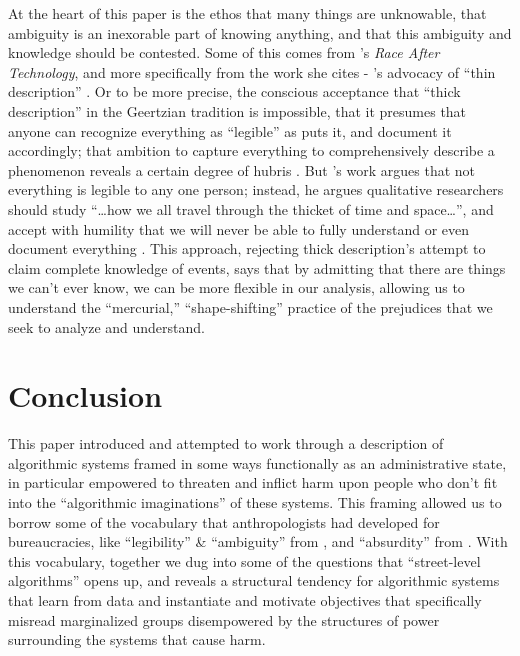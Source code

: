 \documentclass[manuscript,screen]{acmart}
\begin{document}
At the heart of this paper is the ethos that many things are unknowable, that ambiguity is an inexorable part of knowing anything, and that this ambiguity and knowledge should be contested.
Some of this comes from \citeauthor{benjamin2019race}'s \emph{Race After Technology}, and more specifically from the work she cites - \citeauthor{jackson2013thin}'s advocacy of ``thin description''
\cite{benjamin2019race,jackson2013thin}.
Or to be more precise, the conscious acceptance that ``thick description'' in the Geertzian tradition is impossible, that it presumes that anyone can recognize everything as ``legible'' as \citeauthor{scott1998seeing} puts it, and document it accordingly;
that ambition to capture everything to comprehensively describe a phenomenon reveals a certain degree of hubris
\cite{benjamin2019race}.
But \citeauthor{jackson2013thin}'s work argues that not everything is legible to any one person;
instead, he argues qualitative researchers should study ``\dots how we all travel through the thicket of time and space\dots '', and accept with humility that we will never be able to fully understand or even document everything
\cite{jackson2013thin}.
This approach, rejecting thick description's attempt to claim complete knowledge of events, says that by admitting that there are things we can't ever know, we can be more flexible in our analysis, allowing us to understand the ``mercurial,'' ``shape-shifting'' practice of the prejudices that we seek to analyze and understand.


\section{Conclusion}

This paper introduced and attempted to work through a description of algorithmic systems framed in some ways functionally as an administrative state, in particular empowered to threaten and inflict harm upon people who don't fit into the ``algorithmic imaginations'' of these systems.
This framing allowed us to borrow some of the vocabulary that anthropologists had developed for bureaucracies, like ``legibility'' \& ``ambiguity'' from \citeauthor{scott1998seeing}, and ``absurdity'' from \citeauthor{graeber2015utopia}
\cite{graeber2015utopia,scott1998seeing}.
With this vocabulary, together we dug into some of the questions that ``street-level algorithms'' opens up, and reveals a structural tendency for algorithmic systems that learn from data and instantiate and motivate objectives that specifically misread marginalized groups disempowered by the structures of power surrounding the systems that cause harm.
\end{document}
